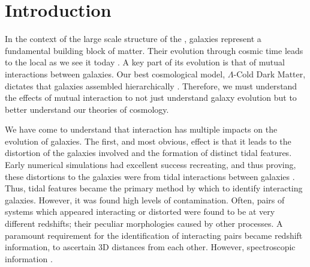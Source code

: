\chapter{Introduction}\label{chapter:introduction}
In the context of the large scale structure of the \DIFdelbegin {}\DIFdelend \DIFaddbegin {}\DIFaddend , galaxies represent a fundamental building block of matter. Their evolution through cosmic time leads to the local \DIFdelbegin {}\DIFdelend \DIFaddbegin {}\DIFaddend as we see it today \citep{2005Natur.435..629S}. A key part of its evolution is that of mutual interactions between galaxies. Our best cosmological model, $\Lambda$-Cold Dark Matter, dictates that galaxies assembled hierarchically \citep{1978MNRAS.183..341W, 1991ApJ...379...52W}. Therefore, we must understand the effects of mutual interaction to not just understand galaxy evolution but to better understand our theories of cosmology.

We have come to understand that interaction has multiple impacts on the evolution of galaxies. The first, and most obvious, effect is that it leads to the distortion of the galaxies involved and the formation of distinct tidal features. Early numerical simulations had excellent success recreating, and thus proving, these distortions to the galaxies were from tidal interactions between galaxies \citep{1972ApJ...178..623T}. Thus, tidal features became the primary method by which to identify interacting galaxies.  However, \DIFdelbegin {}\DIFdelend it was found \DIFdelbegin {}\DIFdelend \DIFaddbegin {}\DIFaddend high levels of contamination\DIFdelbegin {}\DIFdelend . Often, pairs of systems which appeared interacting or distorted were found to be at very different redshifts; their peculiar morphologies caused by other processes. \DIFaddbegin {}\DIFaddend A paramount requirement for the identification of interacting pairs became redshift information, to ascertain \DIFdelbegin {}\DIFdelend \DIFaddbegin {}\DIFaddend 3D distances from each other. However, spectroscopic information \DIFdelbegin {}\DIFdelend \DIFaddbegin {}\DIFaddend .


